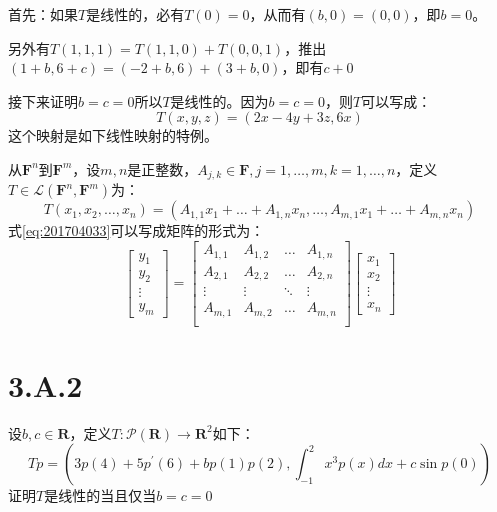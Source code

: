 \documentclass[10pt,a4paper,UTF8]{article}
\begin{document}
\begin{answer}
首先：如果\(T\)是线性的，必有\(T(0) = 0\)，从而有\((b,0) = (0,0)\)，即\(b=0\)。

另外有\(T(1,1,1) = T(1,1,0) + T(0,0,1)\)，推出\((1+b,6+c) = (-2+b,6) + (3+b,0)\)，即有\(c+0\)

接下来证明\(b=c=0\)所以\(T\)是线性的。因为\(b=c=0\)，则\(T\)可以写成：
\[T(x,y,z) = (2x-4y+3z,6x)\]
这个映射是如下线性映射的特例。

从\(\mathbf{F}^{n}\)到\(\mathbf{F}^{m}\)，设\(m,n\)是正整数，\(A_{j,k}\in \mathbf{F},j = 1,\ldots ,m,k=1,\ldots ,n\)，定义\(T\in \mathcal{L}(\mathbf{F}^{n}, \mathbf{F}^{m})\)为：
\begin{equation}
\label{eq:201704033}
T(x_{1},x_{2},\ldots ,x_{n}) = (A_{1,1}x_{1} + \ldots  + A_{1,n}x_{n}, \ldots , A_{m,1}x_{1} + \ldots + A_{m,n}x_{n})
\end{equation}
式\ref{eq:201704033}可以写成矩阵的形式为：
\begin{equation}
\label{eq:201704034}
\begin{bmatrix}
y_{1} \\ y_{2} \\ \vdots \\ y_{m}
\end{bmatrix}
=
\begin{bmatrix}
A_{1,1} & A_{1,2}  & \ldots & A_{1,n} \\
A_{2,1} & A_{2,2}  & \ldots & A_{2,n} \\
\vdots & \vdots  & \ddots & \vdots \\
A_{m,1} & A_{m,2}  & \ldots & A_{m,n} \\
\end{bmatrix}
\begin{bmatrix}
x_{1} \\ x_{2} \\ \vdots \\ x_{n}
\end{bmatrix}
\end{equation}
\end{answer}
\section{3.A.2}
\label{sec:orgaa1fe74}


\begin{problem}
设\(b,c\in \mathbf{R}\)，定义\(T: \mathcal{P}( \mathbf{R}) \rightarrow \mathbf{R}^{2}\)如下：
\begin{equation}
\label{eq:1}
Tp = (3p(4) + 5p^{'}(6) + bp(1)p(2),\int_{-1}^{2}x^{3}p(x)dx + c\sin p(0))
\end{equation}
证明\(T\)是线性的当且仅当\(b=c=0\)
\end{problem}
\end{document}
